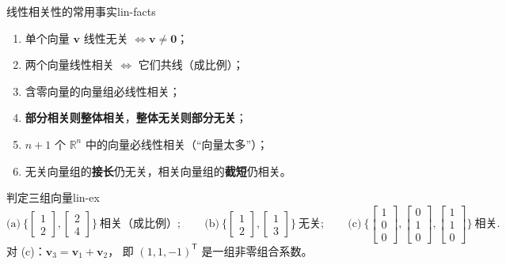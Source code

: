 \documentclass[11pt,a4paper,openany]{ctexbook}
\newcommand{\Rnum}[1]{\mathbb{R}^{#1}}
\begin{document}
\begin{prop}{线性相关性的常用事实}{lin-facts}
\begin{enumerate}[label=(\arabic*), itemsep=1pt]
\item 单个向量 $\boldsymbol{v}$ 线性无关 $\Leftrightarrow\boldsymbol{v}\neq\boldsymbol{0}$；
\item 两个向量线性相关 $\Leftrightarrow$ 它们共线（成比例）；
\item 含零向量的向量组必线性相关；
\item \textbf{部分相关则整体相关}，\textbf{整体无关则部分无关}；
\item $n+1$ 个 $\Rnum{n}$ 中的向量必线性相关（“向量太多”）；
\item 无关向量组的\textbf{接长}仍无关，相关向量组的\textbf{截短}仍相关。
\end{enumerate}
\end{prop}

\begin{exmp}{判定三组向量}{lin-ex}
\[
\text{(a)}\ \Big\{\begin{bmatrix}1\\2\end{bmatrix},
                 \begin{bmatrix}2\\4\end{bmatrix}\Big\}
\ \text{相关（成比例）};\qquad
\text{(b)}\ \Big\{\begin{bmatrix}1\\2\end{bmatrix},
                 \begin{bmatrix}1\\3\end{bmatrix}\Big\}
\ \text{无关};\qquad
\text{(c)}\ \Big\{\begin{bmatrix}1\\0\\0\end{bmatrix},
   \begin{bmatrix}0\\1\\0\end{bmatrix},
   \begin{bmatrix}1\\1\\0\end{bmatrix}\Big\}\ \text{相关}.
\]
对 (c)：$\boldsymbol{v}_3=\boldsymbol{v}_1+\boldsymbol{v}_2$，
即 $(1,1,-1)^{\mathsf T}$ 是一组非零组合系数。
\end{exmp}
\end{document}
